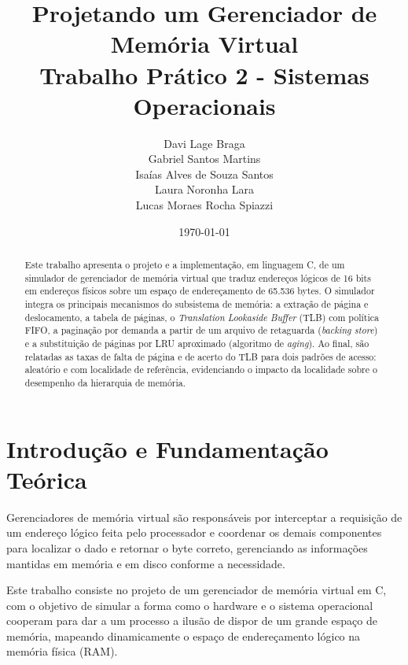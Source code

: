 \documentclass[11pt,a4paper]{article}
\title{Projetando um Gerenciador de Memória Virtual\\
       \large Trabalho Prático 2 - Sistemas Operacionais}
\author{
    Davi Lage Braga \\
    Gabriel Santos Martins \\
    Isaías Alves de Souza Santos \\
    Laura Noronha Lara \\
    Lucas Moraes Rocha Spiazzi
}
\date{\today}
\begin{document}
\maketitle

\vspace{5cm}

\begin{abstract}
Este trabalho apresenta o projeto e a implementação, em linguagem C, de um
simulador de gerenciador de memória virtual que traduz endereços lógicos de
16 bits em endereços físicos sobre um espaço de endereçamento de 65.536 bytes.
O simulador integra os principais mecanismos do subsistema de memória: a
extração de página e deslocamento, a tabela de páginas, o \textit{Translation
Lookaside Buffer} (TLB) com política FIFO, a paginação por demanda a partir de
um arquivo de retaguarda (\textit{backing store}) e a substituição de páginas
por LRU aproximado (algoritmo de \textit{aging}). Ao final, são relatadas as
taxas de falta de página e de acerto do TLB para dois padrões de acesso:
aleatório e com localidade de referência, evidenciando o impacto da
localidade sobre o desempenho da hierarquia de memória.
\end{abstract}

\newpage
\tableofcontents
\newpage

\section{Introdução e Fundamentação Teórica}
\label{sec:introducao}

Gerenciadores de memória virtual são responsáveis por interceptar a requisição
de um endereço lógico feita pelo processador e coordenar os demais componentes
para localizar o dado e retornar o byte correto, gerenciando as informações
mantidas em memória e em disco conforme a necessidade.

Este trabalho consiste no projeto de um gerenciador de memória virtual em C, com
o objetivo de simular a forma como o hardware e o sistema operacional cooperam
para dar a um processo a ilusão de dispor de um grande espaço de memória,
mapeando dinamicamente o espaço de endereçamento lógico na memória física (RAM).
\end{document}
